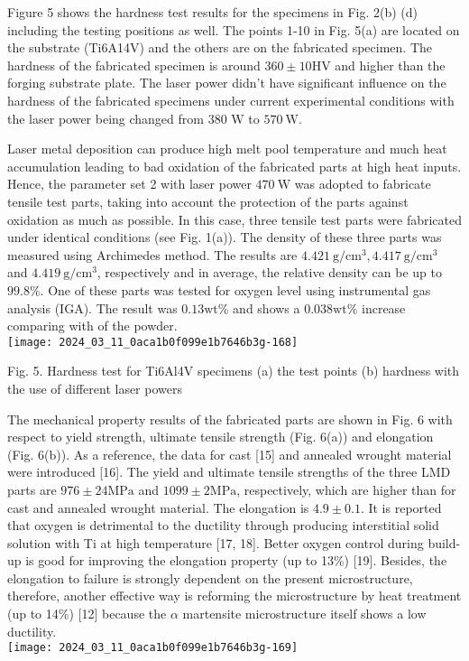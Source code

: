 \documentclass[10pt]{article}
\begin{document}
Figure 5 shows the hardness test results for the specimens in Fig. 2(b) (d) including the testing positions as well. The points 1-10 in Fig. 5(a) are located on the substrate (Ti6A14V) and the others are on the fabricated specimen. The hardness of the fabricated specimen is around $360 \pm 10 \mathrm{HV}$ and higher than the forging substrate plate. The laser power didn't have significant influence on the hardness of the fabricated specimens under current experimental conditions with the laser power being changed from 380 $\mathrm{W}$ to $570 \mathrm{~W}$.

Laser metal deposition can produce high melt pool temperature and much heat accumulation leading to bad oxidation of the fabricated parts at high heat inputs. Hence, the parameter set 2 with laser power $470 \mathrm{~W}$ was adopted to fabricate tensile test parts, taking into account the protection of the parts against oxidation as much as possible. In this case, three tensile test parts were fabricated under identical conditions (see Fig. 1(a)). The density of these three parts was measured using Archimedes method. The results are $4.421 \mathrm{~g} / \mathrm{cm}^{3}, 4.417 \mathrm{~g} / \mathrm{cm}^{3}$ and $4.419 \mathrm{~g} / \mathrm{cm}^{3}$, respectively and in average, the relative density can be up to $99.8 \%$. One of these parts was tested for oxygen level using instrumental gas analysis (IGA). The result was $0.13 \mathrm{wt} \%$ and shows a $0.038 \mathrm{wt} \%$ increase comparing with of the powder.\\
\texttt{[image: 2024\_03\_11\_0aca1b0f099e1b7646b3g-168]}

Fig. 5. Hardness test for Ti6Al4V specimens (a) the test points (b) hardness with the use of different laser powers

The mechanical property results of the fabricated parts are shown in Fig. 6 with respect to yield strength, ultimate tensile strength (Fig. 6(a)) and elongation (Fig. 6(b)). As a reference, the data for cast [15] and annealed wrought material were introduced [16]. The yield and ultimate tensile strengths of the three LMD parts are $976 \pm 24 \mathrm{MPa}$ and $1099 \pm 2 \mathrm{MPa}$, respectively, which are higher than for cast and annealed wrought material. The elongation is $4.9 \pm 0.1$. It is reported that oxygen is detrimental to the ductility through producing interstitial solid solution with Ti at high temperature [17, 18]. Better oxygen control during build-up is good for improving the elongation property (up to 13\%) [19]. Besides, the elongation to failure is strongly dependent on the present microstructure, therefore, another effective way is reforming the microstructure by heat treatment (up to 14\%) [12] because the $\alpha$ martensite microstructure itself shows a low ductility.\\
\texttt{[image: 2024\_03\_11\_0aca1b0f099e1b7646b3g-169]}
\end{document}
